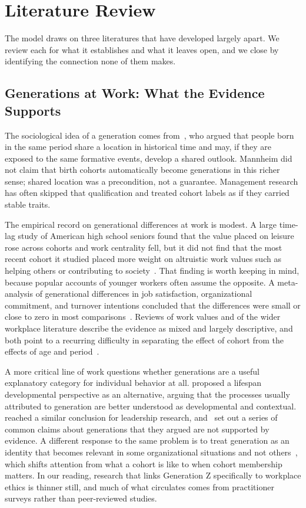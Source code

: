 \section{Literature Review}
The model draws on three literatures that have developed largely apart. We review each for what it establishes and what it leaves open, and we close by identifying the connection none of them makes.

\subsection{Generations at Work: What the Evidence Supports}

The sociological idea of a generation comes from~\citet{mannheim1952problem}, who argued that people born in the same period share a location in historical time and may, if they are exposed to the same formative events, develop a shared outlook. Mannheim did not claim that birth cohorts automatically become generations in this richer sense; shared location was a precondition, not a guarantee. Management research has often skipped that qualification and treated cohort labels as if they carried stable traits.

The empirical record on generational differences at work is modest. A large time-lag study of American high school seniors found that the value placed on leisure rose across cohorts and work centrality fell, but it did not find that the most recent cohort it studied placed more weight on altruistic work values such as helping others or contributing to society~\citep{twenge2010generational}. That finding is worth keeping in mind, because popular accounts of younger workers often assume the opposite. A meta-analysis of generational differences in job satisfaction, organizational commitment, and turnover intentions concluded that the differences were small or close to zero in most comparisons~\citep{costanza2012generational}. Reviews of work values and of the wider workplace literature describe the evidence as mixed and largely descriptive, and both point to a recurring difficulty in separating the effect of cohort from the effects of age and period~\citep{parry2011generational,lyons2014generational}.

A more critical line of work questions whether generations are a useful explanatory category for individual behavior at all. \citet{rudolph2017considering} proposed a lifespan developmental perspective as an alternative, arguing that the processes usually attributed to generation are better understood as developmental and contextual. \citet{rudolph2018leadership} reached a similar conclusion for leadership research, and~\citet{rudolph2021generations} set out a series of common claims about generations that they argued are not supported by evidence. A different response to the same problem is to treat generation as an identity that becomes relevant in some organizational situations and not others~\citep{joshi2010unpacking}, which shifts attention from what a cohort is like to when cohort membership matters. In our reading, research that links Generation Z specifically to workplace ethics is thinner still, and much of what circulates comes from practitioner surveys rather than peer-reviewed studies.

